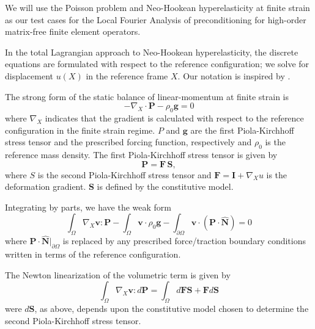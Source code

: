 We will use the Poisson problem and Neo-Hookean hyperelasticity at finite strain as our test cases for the Local Fourier Analysis of preconditioning for high-order matrix-free finite element operators.

In the total Lagrangian approach to Neo-Hookean hyperelasticity, the discrete equations are formulated with respect to the reference configuration; we solve for displacement $u \left( X \right)$ in the reference frame $X$.
Our notation is inspired by \cite{holzapfel2000nonlinear}.

The strong form of the static balance of linear-momentum at finite strain is
\begin{equation}
- \nabla_X \cdot \boldsymbol{P} - \rho_0 \boldsymbol{g} = 0
\label{finite_strong}
\end{equation}
where $\nabla_X$ indicates that the gradient is calculated with respect to the reference configuration in the finite strain regime.
$P$ and $\boldsymbol{g}$ are the first Piola-Kirchhoff stress tensor and the prescribed forcing function, respectively and $\rho_0$ is the reference mass density.
The first Piola-Kirchhoff stress tensor is given by
\begin{equation}
\boldsymbol{P} = \boldsymbol{F} \, \boldsymbol{S},
\label{first_pk}
\end{equation}
where $S$ is the second Piola-Kirchhoff stress tensor and $\boldsymbol{F} = \boldsymbol{I} + \nabla_X u$ is the deformation gradient.
$\boldsymbol{S}$ is defined by the constitutive model.

Integrating by parts, we have the weak form
\begin{equation}
\int_{\Omega}{\nabla_X \boldsymbol{v} \colon \boldsymbol{P}} - \int_{\Omega}{\boldsymbol{v} \cdot \rho_0 \boldsymbol{g}} - \int_{\partial \Omega}{\boldsymbol{v} \cdot (\boldsymbol{P} \cdot \hat{\boldsymbol{N}})} = 0
\label{finite_weak}
\end{equation}
where $\boldsymbol{P} \cdot \hat{\boldsymbol{N}}|_{\partial\Omega}$ is replaced by any prescribed force/traction boundary conditions written in terms of the reference configuration.

The Newton linearization of the volumetric term is given by
\begin{equation}
\int_{\Omega}{\nabla_X \boldsymbol{v} : d \boldsymbol{P}} = \int_{\Omega} d \boldsymbol{F} \boldsymbol{S} + \boldsymbol{F} d \boldsymbol{S}
\label{finite_weak_linear}
\end{equation}
were $d \boldsymbol{S}$, as above, depends upon the constitutive model chosen to determine the second Piola-Kirchhoff stress tensor.

